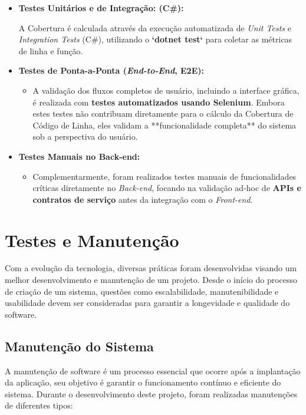 \documentclass[
	12pt,				%
	openany,			%
	twoside,			%
	a4paper,			%
	english,			%
	brazil				%
	]{abntex2}
\begin{document}
\begin{itemize}
    \item \textbf{Testes Unitários e de Integração:  (C\#):}
 
        A Cobertura é calculada através da execução automatizada de \textit{Unit Tests} e \textit{Integration Tests} (C\#), utilizando o \textbf{`dotnet test`} para coletar as métricas de linha e função.
    


    \item \textbf{Testes de Ponta-a-Ponta (\textit{End-to-End}, E2E):}
    \begin{itemize}
        \item A validação dos fluxos completos de usuário, incluindo a interface gráfica, é realizada com \textbf{testes automatizados usando Selenium}. Embora estes testes não contribuam diretamente para o cálculo da Cobertura de Código de Linha, eles validam a **funcionalidade completa** do sistema sob a perspectiva do usuário.
    \end{itemize}

    \item \textbf{Testes Manuais no Back-end:}
    \begin{itemize}
        \item Complementarmente, foram realizados testes manuais de funcionalidades críticas diretamente no \textit{Back-end}, focando na validação ad-hoc de \textbf{APIs e contratos de serviço} antes da integração com o \textit{Front-end}.
    \end{itemize}
\end{itemize}



\section{Testes e Manutenção}
Com a evolução da tecnologia, diversas práticas foram desenvolvidas visando um melhor desenvolvimento e manutenção de um projeto. Desde o início do processo de criação de um sistema, questões como escalabilidade, manutenibilidade e usabilidade devem ser consideradas para garantir a longevidade e qualidade do software.

\subsection{Manutenção do Sistema}

A manutenção de software é um processo essencial que ocorre após a implantação da aplicação, seu objetivo é garantir o funcionamento contínuo e eficiente do sistema. Durante o desenvolvimento deste projeto, foram realizadas manutenções de diferentes tipos:
\end{document}
